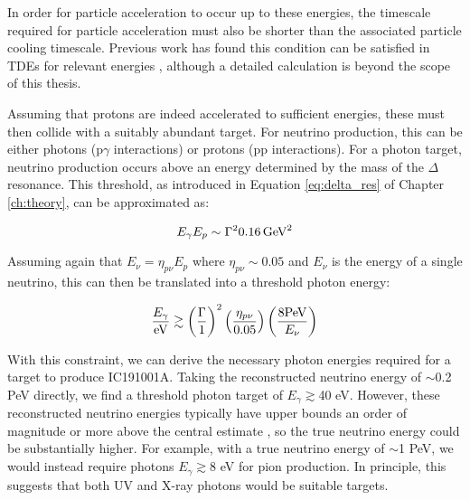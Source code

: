 In order for particle acceleration to occur up to these energies, the timescale required for particle acceleration must also be shorter than the associated particle cooling timescale. Previous work has found this condition can be satisfied in TDEs for relevant energies , although a detailed calculation is beyond the scope of this thesis.

Assuming that protons are indeed accelerated to sufficient energies, these must then collide with a suitably abundant target. For neutrino production, this can be either photons (p$\gamma$ interactions) or protons (pp interactions). For a photon target, neutrino production occurs above an energy determined by the mass of the $\Delta$ resonance. This threshold, as introduced in Equation \ref{eq:delta_res} of Chapter \ref{ch:theory}, can be approximated as:

\begin{equation}
E_{\gamma}E_{p} \sim \Gamma ^{2} 0.16 \,  \textup{GeV}^{2}
\end{equation}  

Assuming again that $E_{\nu} = \eta_{p\nu} E_{p}$ where $\eta_{p\nu} \sim 0.05$ and $E_{\nu}$ is the energy of a single neutrino, this can then be translated into a threshold photon energy:

\begin{equation}
\frac{E_{\gamma}}{\textup{eV}} \gtrsim \left(\frac{\Gamma}{1} \right )^{2} \left(\frac{\eta_{p\nu}}{0.05} \right) \left( \frac{8 \textup{PeV}}{E_{\nu}} \right)
\end{equation}  



With this constraint, we can derive the necessary photon energies required for a target to produce IC191001A. Taking the reconstructed neutrino energy of $\sim$0.2 PeV directly, we find a threshold photon target of $E_{\gamma} \gtrsim $40 eV. However, these reconstructed neutrino energies typically have upper bounds an order of magnitude or more above the central estimate , so the true neutrino energy could be substantially higher. For example, with a true neutrino energy of $\sim$1 PeV, we would instead require photons $E_{\gamma} \gtrsim $8 eV for pion production.  In principle, this suggests that both UV and X-ray photons would be suitable targets.

